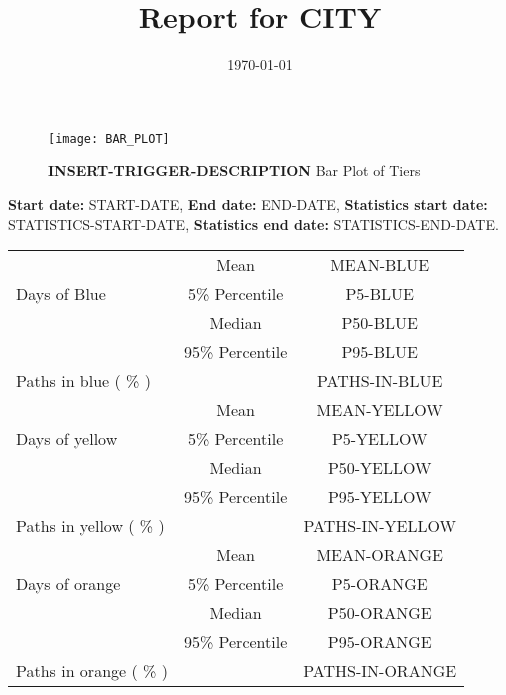\documentclass{article}
\title{Report for CITY}
\author{}
\date{\today}
\begin{document}
\begin{figure}[!htb]
  \centering
   \texttt{[image: BAR\_PLOT]}
    \caption{\textbf{INSERT-TRIGGER-DESCRIPTION} Bar Plot of Tiers}
      \label{fig:IHT}
\end{figure}
 \textbf{Start date:} START-DATE,	
 \textbf{End date:} END-DATE,
\textbf{Statistics start date:} STATISTICS-START-DATE,
\textbf{Statistics end date:} STATISTICS-END-DATE.
\begin{table}[!htb]
	\centering
	\begin{tabular}{p{4cm}cc}
		\toprule
		\multirow{3}{*}{Days of Blue} & Mean      & MEAN-BLUE                     \\ \cmidrule(l){2-3} 
		& 5\% Percentile    & P5-BLUE                      \\ \cmidrule(l){2-3} 
		& Median    & P50-BLUE                     \\ \cmidrule(l){2-3} 
		& 95\% Percentile    & P95-BLUE                          \\ \midrule 
		\multirow{1}{*}{Paths in blue ( \% )} &      &         PATHS-IN-BLUE                \\   \midrule
		\multirow{3}{*}{Days of yellow} & Mean      & MEAN-YELLOW                       \\ \cmidrule(l){2-3} 
		& 5\% Percentile    & P5-YELLOW                      \\ \cmidrule(l){2-3} 
		& Median    & P50-YELLOW                     \\ \cmidrule(l){2-3} 
		& 95\% Percentile    & P95-YELLOW                     \\ \midrule    
		\multirow{1}{*}{Paths in yellow ( \% )} &      &         PATHS-IN-YELLOW           \\   \midrule
		\multirow{3}{*}{Days of orange} & Mean      & MEAN-ORANGE                    \\ \cmidrule(l){2-3} 
		& 5\% Percentile    & P5-ORANGE                      \\ \cmidrule(l){2-3} 
		& Median    & P50-ORANGE                    \\ \cmidrule(l){2-3} 
		& 95\% Percentile    & P95-ORANGE                      \\ \midrule    
		\multirow{1}{*}{Paths in orange ( \% )} &      &         PATHS-IN-ORANGE              \\   \midrule

\end{tabular}
\end{table}
\end{document}
